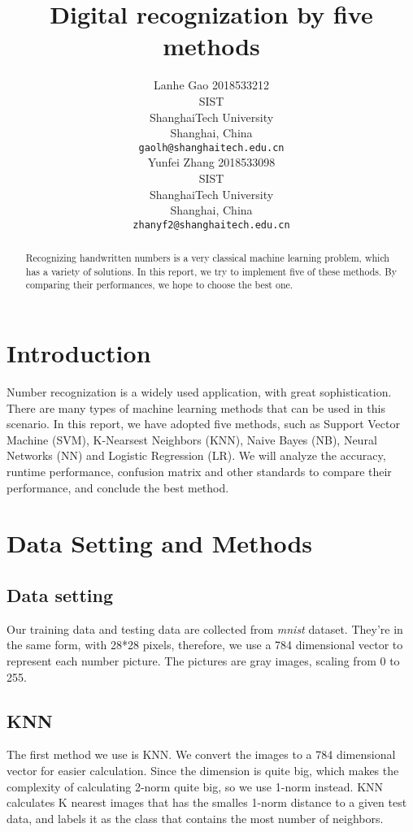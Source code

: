 \documentclass{article}
\title{Digital recognization by five methods}
\author{
	Lanhe Gao 2018533212\\
	SIST\\
	ShanghaiTech University\\
	Shanghai, China \\
	\texttt{gaolh@shanghaitech.edu.cn} \\
	\And
	Yunfei Zhang 2018533098\\
	SIST\\
	ShanghaiTech University\\
	Shanghai, China \\
	\texttt{zhanyf2@shanghaitech.edu.cn} \\
}
\begin{document}
	
	\maketitle
	
	\begin{abstract}
		Recognizing handwritten numbers is a very classical machine learning problem, which has a variety of solutions. In this report, we try to implement five of these methods. By comparing their performances, we hope to choose the best one.
	\end{abstract}

	\section{Introduction}
	
	Number recognization is a widely used application, with great sophistication. There are many types of machine learning methods that can be used in this scenario. In this report, we have adopted five methods, such as Support Vector Machine (SVM), K-Nearsest Neighbors (KNN), Naive Bayes (NB), Neural Networks (NN) and Logistic Regression (LR). We will analyze the accuracy, runtime performance, confusion matrix and other standards to compare their performance, and conclude the best method.
	
	\section{Data Setting and Methods}
	
	\subsection{Data setting}
	
	Our training data and testing data are collected from \textit{mnist} dataset. They're in the same form, with 28*28 pixels, therefore, we use a 784 dimensional vector to represent each number picture. The pictures are gray images, scaling from 0 to 255.
	
	\subsection{KNN}
	
	The first method we use is KNN. We convert the images to a 784 dimensional vector for easier calculation. Since the dimension is quite big, which makes the complexity of calculating 2-norm quite big, so we use 1-norm instead. KNN calculates K nearest images that has the smalles 1-norm distance to a given test data, and labels it as the class that contains the most number of neighbors. 
	
\end{document}
